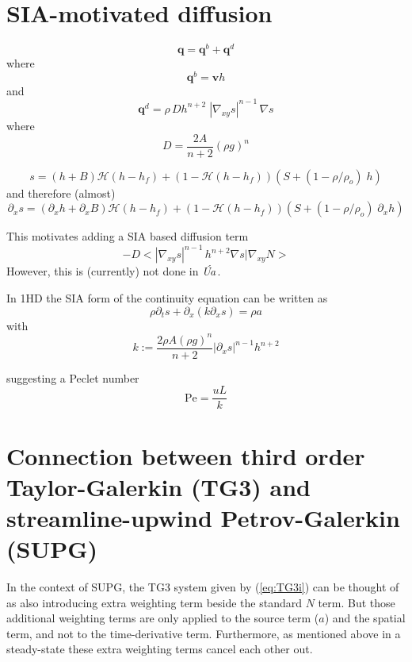 \documentclass[10pt,a4paper]{book}
\newcommand{\He}{\mathcal{H}}
\newcommand{\p}{\partial}
\newcommand{\Ua}{\textsl{\'Ua}\,}
\begin{document}
\section{SIA-motivated diffusion}
\[
\bm{q}= \bm{q}^b+\bm{q}^d
\]
where
\[
\bm{q}^b=\bm{v} h
\]
and
\[
\bm{q}^d= \rho \, D h^{n+2} \; | \nabla_{xy} s |^{n-1} \,  \nabla s 
\]
where
\[
D=\frac{2A}{n+2} (\rho g)^n 
\]


\[
s= (h+B) \He(h-h_f)+ (1-\He(h-h_f)) (S+(1-\rho/\rho_o)\; h )
\]
and therefore (almost)
\[
\p_x s= (\p_x h+ \p_x B) \He(h-h_f)+ (1-\He(h-h_f)) (S+(1-\rho/\rho_o)\; \p_x h )
\]

This motivates adding a SIA based diffusion term
\[
-D <| \nabla_{xy} s | ^{n-1} \, h^{n+2} \nabla s | \nabla_{xy} N >
\]
However, this is (currently) not done in \Ua.

In 1HD the SIA form of the continuity equation can be written as
\[
 \rho \p_t s + \p_x ( k \p_x s) = \rho a
\]
with 
\[
k:= \frac{2 \rho A (\rho g)^n }{n+2}  |\p_x s|^{n-1} h^{n+2}    
\]

suggesting a Peclet number
\[
\mathrm{Pe}= \frac{u L}{k} 
\]


\section{Connection between third order Taylor-Galerkin (TG3) and  streamline-upwind Petrov-Galerkin (SUPG)}

In the context of SUPG, the TG3 system given by (\ref{eq:TG3i}) can be
thought of as also introducing extra weighting term beside the
standard $N$ term. But those additional weighting terms are only
applied to the source term ($a$) and the spatial term, and not to the
time-derivative term. Furthermore, as mentioned above in a steady-state these extra
weighting terms cancel each other out.
\end{document}
